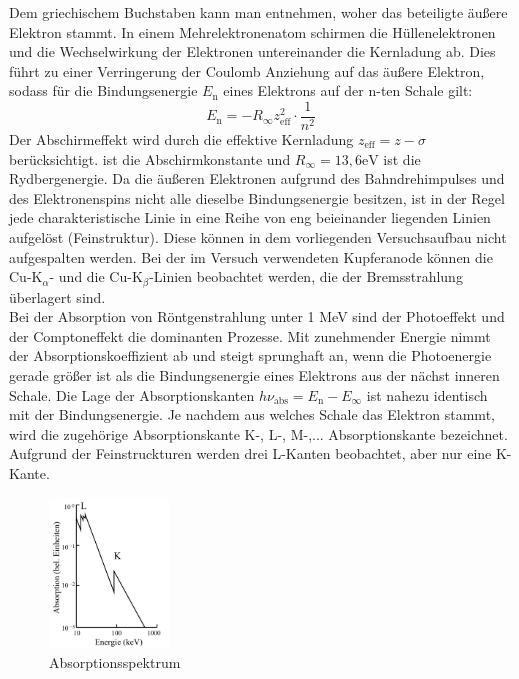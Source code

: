 Dem griechischem Buchstaben kann man entnehmen, woher das beteiligte äußere Elektron stammt.
In einem Mehrelektronenatom schirmen die Hüllenelektronen und die Wechselwirkung der Elektronen untereinander die Kernladung ab.
Dies führt zu einer Verringerung der Coulomb Anziehung auf das äußere Elektron, sodass für die Bindungsenergie $E_\text{n}$ eines Elektrons auf der n-ten Schale gilt:
\begin{equation}
    E_\text{n} = -R_{\infty}z_{\text{eff}}^2 \cdot \frac{1}{n^2}
    \label{eqn:gl2}
\end{equation}
Der Abschirmeffekt wird durch die effektive Kernladung $z_{\text{eff}} = z - \sigma$ berücksichtigt. 
\sigma ist die Abschirmkonstante und $R_{\infty} = 13,6 \text{eV}$ ist die Rydbergenergie.
Da die äußeren Elektronen aufgrund des Bahndrehimpulses und des Elektronenspins nicht alle dieselbe Bindungsenergie besitzen, ist in der Regel jede charakteristische Linie in eine Reihe von eng beieinander liegenden Linien aufgelöst (Feinstruktur).
Diese können in dem vorliegenden Versuchsaufbau nicht aufgespalten werden.
Bei der im Versuch verwendeten Kupferanode können die $\text{Cu-K}_{\alpha}\text{- und die Cu-K}_{\beta}\text{-Linien}$ beobachtet werden, die der Bremsstrahlung überlagert sind.\\
\noindent
Bei der Absorption von Röntgenstrahlung unter 1 MeV sind der Photoeffekt und der Comptoneffekt die dominanten Prozesse.
Mit zunehmender Energie nimmt der Absorptionskoeffizient ab und steigt sprunghaft an, wenn die Photoenergie gerade größer ist als die Bindungsenergie eines Elektrons aus der nächst inneren Schale.
Die Lage der Absorptionskanten $h \nu_{\text{abs}} = E_{\text{n}} - E_{\infty}$ ist nahezu identisch mit der Bindungsenergie.
Je nachdem aus welches Schale das Elektron stammt, wird die zugehörige Absorptionskante K-, L-, M-,... Absorptionskante bezeichnet.
Aufgrund der Feinstruckturen werden drei L-Kanten beobachtet, aber nur eine K-Kante.
\begin{figure}
    \centering
    \includegraphics[height=4.0cm]{data/abb2.jpg}
    \caption{Absorptionsspektrum \cite{V602}}
    \label{fig:abb2}
\end{figure} \\

